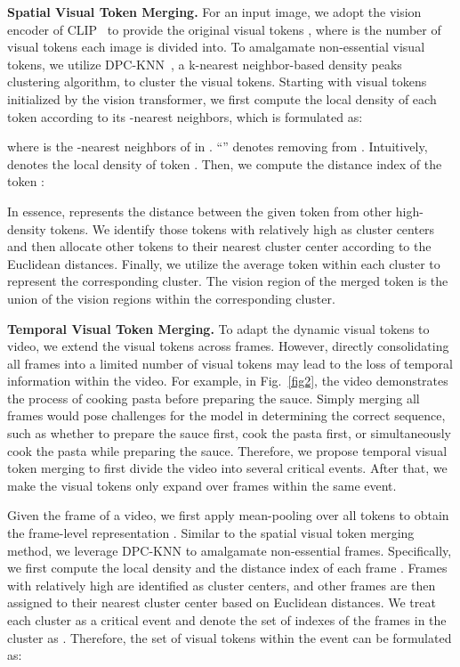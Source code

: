 \documentclass[10pt,twocolumn,letterpaper]{article}
\newcommand{\myparagraph}[1]{\textbf{#1}\hspace{1.8ex}}
\begin{document}
\noindent \myparagraph{Spatial Visual Token Merging.} 
For an input image, we adopt the vision encoder of CLIP~\cite{radford2021learning} to provide the original visual tokens , where  is the number of visual tokens each image is divided into. To amalgamate non-essential visual tokens, we utilize DPC-KNN~\cite{du2016study}, a k-nearest neighbor-based density peaks clustering algorithm, to cluster the visual tokens. Starting with visual tokens  initialized by the vision transformer, we first compute the local density  of each token  according to its -nearest neighbors, which is formulated as:

where  is the -nearest neighbors of  in . ``'' denotes removing  from . Intuitively,  denotes the local density of token . Then, we compute the distance index  of the token :

In essence,  represents the distance between the given token  from other high-density tokens. We identify those tokens with relatively high  as cluster centers and then allocate other tokens to their nearest cluster center according to the Euclidean distances. Finally, we utilize the average token within each cluster to represent the corresponding cluster. The vision region of the merged token is the union of the vision regions within the corresponding cluster.

\noindent \myparagraph{Temporal Visual Token Merging.} 
To adapt the dynamic visual tokens to video, we extend the visual tokens across frames. However, directly consolidating all frames into a limited number of visual tokens may lead to the loss of temporal information within the video. For example, in Fig.~\ref{fig2}, the video demonstrates the process of cooking pasta before preparing the sauce. Simply merging all frames would pose challenges for the model in determining the correct sequence, such as whether to prepare the sauce first, cook the pasta first, or simultaneously cook the pasta while preparing the sauce. Therefore, we propose temporal visual token merging to first divide the video into several critical events. After that, we make the visual tokens only expand over frames within the same event.

Given the  frame  of a video, we first apply mean-pooling over all tokens to obtain the frame-level representation . Similar to the spatial visual token merging method, we leverage DPC-KNN to amalgamate non-essential frames. Specifically, we first compute the local density  and the distance index  of each frame . Frames with relatively high  are identified as cluster centers, and other frames are then assigned to their nearest cluster center based on Euclidean distances. We treat each cluster as a critical event and denote the set of indexes of the frames in the cluster as . Therefore, the set of visual tokens within the  event  can be formulated as:
\end{document}
